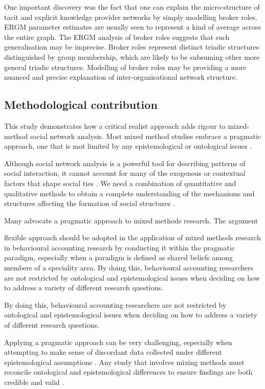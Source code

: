 One important discovery was the fact that one can explain the micro-structure of tacit and explicit knowledge provider networks by simply modelling broker roles. ERGM parameter estimates are usually seen to represent a kind of average across the entire graph. The ERGM analysis of broker roles suggests that such generalisation may be imprecise. Broker roles represent distinct triadic structures distinguished by group membership, which are likely to be subsuming other more general triadic structures. Modelling of broker roles may be providing a more nuanced and precise explanation of inter-organisational network structure. 

\subsection{Methodological contribution}

This study demonstrates how a critical realist approach adds rigour to mixed-method social network analysis. Most mixed method studies embrace a pragmatic approach, one that is mot limited by any epistemological or ontological issues \citep{brierley2017role}.  


Although social network analysis is a powerful tool for describing patterns of social interaction, it cannot account for many of the exogenous or contextual factors that shape social ties \citep{fafchamps2015causal}. We need a combination of quantitative and qualitative methods to obtain a complete understanding of the mechanisms and structures affecting the formation of social structures \citep{welch2011theorising,bellotti2014qualitative}. 

Many advocate a pragmatic approach to mixed methods research. The argument  

flexible approach should be adopted in the application of mixed methods research in behavioural accounting research by conducting it within the pragmatic paradigm, especially when a paradigm is defined as shared beliefs among members of a speciality area. By doing this, behavioural accounting researchers are not restricted by ontological and epistemological issues when deciding on how to address a variety of different research questions.

By doing this, behavioural accounting researchers are not restricted by ontological and epistemological issues when deciding on how to address a variety of different research questions.

Applying a pragmatic approach can be very challenging, especially when attempting to make sense of discordant data collected under different epistemological assumptions \citep{johnson2004mixed,giddings2006mixed}. Any study that involves mixing methods must reconcile ontological and epistemological differences to ensure findings are both credible and valid \citep{zachariadis2013methodological}.


